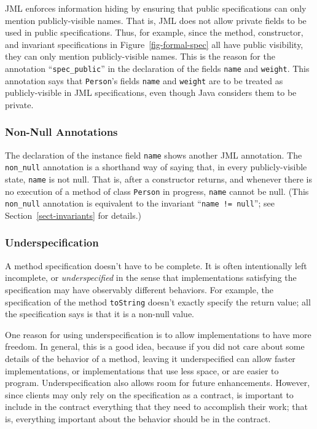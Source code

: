 \documentclass{jotarticle}
\begin{document}
JML enforces information hiding by ensuring that public specifications
can only mention publicly-visible names.
That is, JML does not allow private fields to be used in public
specifications. 
Thus, for example, since the method, constructor, and invariant
specifications in Figure~\ref{fig-formal-spec} all have public
visibility, they can only mention publicly-visible names.  This is the
reason for the annotation ``\texttt{spec\_public}''
in the declaration of the fields \texttt{name} and \texttt{weight}.
This annotation says that \texttt{Person}'s fields \texttt{name} and
\texttt{weight} are to be treated as publicly-visible in JML
specifications, even though Java considers them to be private.

\subsubsection{Non-Null Annotations}

The declaration of the instance field \texttt{name} shows another JML
annotation.  The 
\texttt{non\_null} annotation is a shorthand way of saying that,
in every publicly-visible state, \texttt{name} is not null.
That is, after a constructor returns, and whenever there is no
execution of a method of class \texttt{Person} in progress,
\texttt{name} cannot be null.
(This \texttt{non\_null} annotation is equivalent to the invariant
``\texttt{name != null}''; see Section~\ref{sect-invariants} for details.)

\subsubsection{Underspecification}

A method specification doesn't have to be complete. It is often
intentionally left incomplete, or \emph{underspecified\/} in the sense
that implementations satisfying the specification may have observably
different behaviors.
For example, the specification of the
method \texttt{toString} doesn't exactly specify the return value; all
the specification says is that it is a non-null value.

One reason for using underspecification is to allow implementations to
have more freedom.  In general, this is a good idea, because if you
did not care about some details of the behavior of a method, leaving
it underspecified can allow faster implementations, or implementations
that use less space, or are easier to program.  Underspecification
also allows room for future enhancements.  However, since clients may
only rely on the specification as a contract, is important to include
in the contract everything that they need to accomplish their work;
that is, everything important about the behavior should be in the contract.
\end{document}
